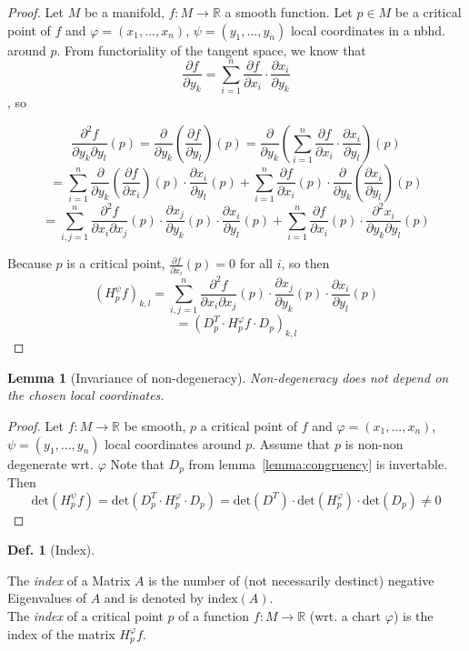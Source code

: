 \documentclass{article}
\theoremstyle{plain}
\theoremstyle{plain}
\theoremstyle{plain}
\newtheorem{lemma}{Lemma}[subsection]
\theoremstyle{definition}
\newtheorem{definition}{Def.}[subsection]
\theoremstyle{remark}
\newcommand{\pderive}[2][]{\frac{\partial #1 }{\partial #2}}
\newcommand{\pdderive}[3][]{\frac{\partial^2 #1}{\partial #2 \partial #3}}
\begin{document}
\begin{proof}

   Let $M$ be a manifold, $f: M \rightarrow \mathbb{R}$ a smooth function.
   Let $p \in M$ be a critical point of $f$ and $\varphi = (x_1, ..., x_n)$, $\psi = (y_1, ..., y_n)$
   local coordinates in a nbhd. around $p$.
   From functoriality of the tangent space, we know that 
   \[ \frac{\partial f}{\partial y_k} = \sum_{i=1}^n \frac{\partial f}{\partial x_i} \cdot \frac{\partial x_i}{\partial y_k} \]
   , so 

   \[ \pdderive[f]{y_k}{y_l} (p) 
   = \pderive{y_k} \left( \pderive[f]{y_l} \right) (p) 
   = \pderive{y_k} \left( \sum_{i=1}^n \pderive[f]{x_i} \cdot \pderive[x_i]{y_l} \right) (p) \]
   \[ = \sum_{i=1}^n \pderive{y_k} \left( \pderive[f]{x_i} \right) (p) \cdot \pderive[x_i]{y_l} (p) 
   + \sum_{i=1}^n \pderive[f]{x_i} (p) \cdot \pderive{y_k} \left( \pderive[x_i]{y_l} \right) (p) \]
   \[ = \sum_{i,j = 1}^n \pdderive[f]{x_i}{x_j} (p) \cdot \pderive[x_j]{y_k} (p) \cdot \pderive[x_i]{y_l}(p)
   + \sum_{i=1}^n \pderive[f]{x_i} (p) \cdot \pdderive[x_i]{y_k}{y_l}(p)\]
   
   Because $p$ is a critical point, $\pderive[f]{x_i} (p) = 0$ for all $i$, so then
   \[ \left( H_p^{\psi}f \right)_{k,l} = \sum_{i,j = 1}^n \pdderive[f]{x_i}{x_j} (p) \cdot \pderive[x_j]{y_k}(p) \cdot \pderive[x_i]{y_l} (p) \]
   \[ = \left( D_p^T \cdot H_p^{\varphi}f \cdot D_p \right)_{k,l} \]

\end{proof}

\begin{lemma}[Invariance of non-degeneracy] 
   \label{lemma:non-degeneracy}
   Non-degeneracy does not depend on the chosen local coordinates.
\end{lemma}

\begin{proof}
   Let $f: M \rightarrow \mathbb{R}$ be smooth, $p$ a critical point of $f$ and $\varphi = (x_1, ..., x_n)$, $\psi = (y_1, ..., y_n)$ 
   local coordinates around $p$. Assume that $p$ is non-non degenerate wrt. $\varphi$ Note that $D_p$ from lemma~\ref{lemma:congruency} is invertable. Then
   \[ \text{det}(H_p^{\psi}f) = \text{det}(D_p^T \cdot H_p^{\varphi} \cdot D_p) = \text{det}(D^T) \cdot \text{det}(H_p^{\varphi}) \cdot \text{det}(D_p) \neq 0 \]
\end{proof}

\begin{definition}[Index]
   \label{def:index}

   The \textit{index} of a Matrix $A$ is the number of (not necessarily destinct) negative Eigenvalues of $A$ and is denoted by
   $\text{index}(A)$. \\ The \textit{index} of a critical point $p$ of a function $f: M \rightarrow \mathbb{R}$ (wrt. a chart $\varphi$)
   is the index of the matrix $H_p^{\varphi}f$.
\end{definition}
\end{document}

